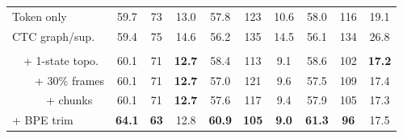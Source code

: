 \begin{table}[t]
\begin{tabular}{@{}l|ccc|ccc|ccc@{}}
\quad Token only
& \cellcolor{cgood}59.7
& \cellcolor{cgood}73
& \cellcolor{cgood}13.0
& \cellcolor{cmed}57.8
& \cellcolor{cmed}123
& \cellcolor{cmed}10.6
& \cellcolor{cmed}58.0
& \cellcolor{cmed}116
& \cellcolor{cmed}19.1 \\

\quad CTC graph/sup.
& \cellcolor{cgood}59.4
& \cellcolor{cgood}75
& \cellcolor{cmed}14.6
& \cellcolor{cmed}56.2
& \cellcolor{cpoor}135
& \cellcolor{cpoor}14.5
& \cellcolor{cmed}56.1
& \cellcolor{cpoor}134
& \cellcolor{cpoor}26.8 \\
\midrule
\addlinespace[1pt]
\multicolumn{10}{@{}l}{\textbf{Long-form Tricks}} \\[-1pt]
\midrule
\ \ + 1-state topo.
& \cellcolor{cgood}60.1
& \cellcolor{cgood}71
& \cellcolor{cbest}\textbf{12.7}
& \cellcolor{cgood}58.4
& \cellcolor{cgood}113
& \cellcolor{cgood}9.1
& \cellcolor{cgood}58.6
& \cellcolor{cgood}102
& \cellcolor{cbest}\textbf{17.2} \\

\ \ \ \ + 30\% frames
& \cellcolor{cgood}60.1
& \cellcolor{cgood}71
& \cellcolor{cbest}\textbf{12.7}
& \cellcolor{cmed}57.0
& \cellcolor{cmed}121
& \cellcolor{cgood}9.6
& \cellcolor{cmed}57.5
& \cellcolor{cmed}109
& \cellcolor{cgood}17.4 \\

\ \ \ \ \ \  + chunks
& \cellcolor{cgood}60.1
& \cellcolor{cgood}71
& \cellcolor{cbest}\textbf{12.7}
& \cellcolor{cmed}57.6
& \cellcolor{cgood}117
& \cellcolor{cgood}9.4
& \cellcolor{cmed}57.9
& \cellcolor{cgood}105
& \cellcolor{cgood}17.3 \\

\quad + BPE trim
& \cellcolor{cbest}\textbf{64.1}
& \cellcolor{cbest}\textbf{63}
& \cellcolor{cgood}12.8
& \cellcolor{cbest}\textbf{60.9}
& \cellcolor{cbest}\textbf{105}
& \cellcolor{cbest}\textbf{9.0}
& \cellcolor{cbest}\textbf{61.3}
& \cellcolor{cbest}\textbf{96}
& \cellcolor{cgood}17.5 \\

\bottomrule
\end{tabular}
\end{table}

